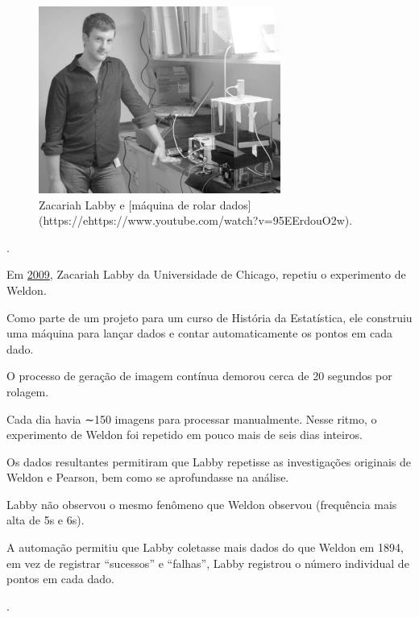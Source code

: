 \documentclass[
]{book}
\begin{document}
\begin{figure}

\hfill{}\includegraphics[width=300px]{figs/Zacariah_Labby} 

\caption{Zacariah Labby e [máquina de rolar dados](https://ehttps://www.youtube.com/watch?v=95EErdouO2w).}\label{fig:labbym}
\end{figure}

.\linebreak

Em \href{https://doi.org/10.1007/s00144-009-0036-8}{2009}, Zacariah Labby da Universidade de Chicago, repetiu o experimento de Weldon.

Como parte de um projeto para um curso de História da Estatística, ele construiu uma máquina para lançar dados e contar automaticamente os pontos em cada dado.

O processo de geração de imagem contínua demorou cerca de 20 segundos por rolagem.

Cada dia havia ∼150 imagens para processar manualmente. Nesse ritmo, o experimento de Weldon foi repetido em pouco mais de seis dias inteiros.

Os dados resultantes permitiram que Labby repetisse as investigações originais de Weldon e Pearson, bem como se aprofundasse na análise.

Labby não observou o mesmo fenômeno que Weldon observou (frequência mais alta de 5s e 6s).

A automação permitiu que Labby coletasse mais dados do que Weldon em 1894, em vez de registrar ``sucessos'' e ``falhas'', Labby registrou o número individual de pontos em cada dado.

.\linebreak
\end{document}

